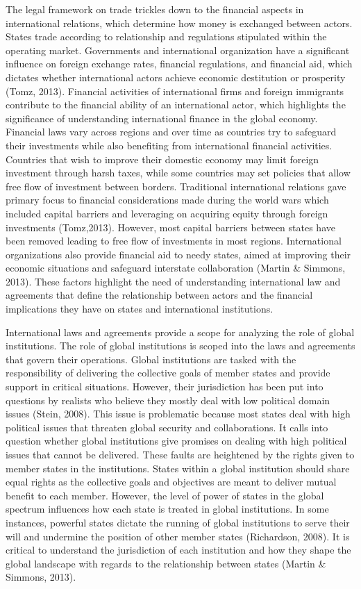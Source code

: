 \documentclass[11pt]{article}
\begin{document}
The legal framework on trade trickles down to the financial aspects in international relations, which determine how money is exchanged between actors. States trade according to relationship and regulations stipulated within the operating market. Governments and international organization have a significant influence on foreign exchange rates, financial regulations, and financial aid, which dictates whether international actors achieve economic destitution or prosperity (Tomz, 2013). Financial activities of international firms and foreign immigrants contribute to the financial ability of an international actor, which highlights the significance of understanding international finance in the global economy. Financial laws vary across regions and over time as countries try to safeguard their investments while also benefiting from international financial activities. Countries that wish to improve their domestic economy may limit foreign investment through harsh taxes, while some countries may set policies that allow free flow of investment between borders. Traditional international relations gave primary focus to financial considerations made during the world wars which included capital barriers and leveraging on acquiring equity through foreign investments (Tomz,2013). However, most capital barriers between states have been removed leading to free flow of investments in most regions. International organizations also provide financial aid to needy states, aimed at improving their economic situations and safeguard interstate collaboration (Martin \& Simmons, 2013). These factors highlight the need of understanding international law and agreements that define the relationship between actors and the financial implications they have on states and international institutions.

International laws and agreements provide a scope for analyzing the role of global institutions. The role of global institutions is scoped into the laws and agreements that govern their operations. Global institutions are tasked with the responsibility of delivering the collective goals of member states and provide support in critical situations. However, their jurisdiction has been put into questions by realists who believe they mostly deal with low political domain issues (Stein, 2008). This issue is problematic because most states deal with high political issues that threaten global security and collaborations. It calls into question whether global institutions give promises on dealing with high political issues that cannot be delivered. These faults are heightened by the rights given to member states in the institutions. States within a global institution should share equal rights as the collective goals and objectives are meant to deliver mutual benefit to each member. However, the level of power of states in the global spectrum influences how each state is treated in global institutions. In some instances, powerful states dictate the running of global institutions to serve their will and undermine the position of other member states (Richardson, 2008). It is critical to understand the jurisdiction of each institution and how they shape the global landscape with regards to the relationship between states (Martin \& Simmons, 2013).
\end{document}

